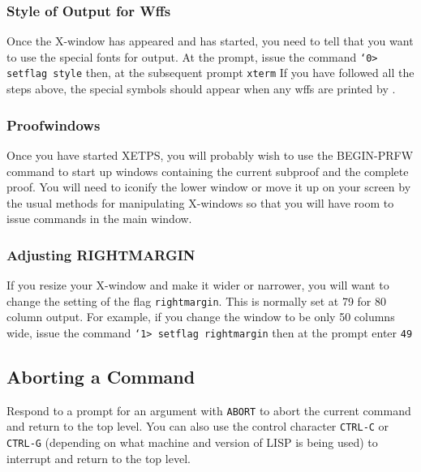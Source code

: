 \documentclass{article}
\begin{document}
\subsubsection{Style of Output for Wffs}

Once the X-window has appeared and {\ETPS} has started, you need to tell
{\ETPS} that you want to use the special fonts for output.  At the {\ETPS}
prompt, issue the command \newline{}
{\tt {\tt\char`\<}0> setflag style} \newline{}
then, at the subsequent prompt \newline{}
{\tt xterm}\newline{}
If you have followed all the steps
above, the special symbols should appear when any wffs are printed by
{\ETPS}.

\subsubsection{Proofwindows}

Once you have started XETPS, you will probably wish to use the
BEGIN-PRFW command to start up windows containing the current subproof
and the complete proof.  You will need to iconify the lower window or
move it up on your screen by the usual methods for manipulating
X-windows so that you will have room to issue commands in the main
{\ETPS} window.

\subsubsection{Adjusting RIGHTMARGIN}

If you resize your {\ETPS} X-window and make it wider or narrower, you will
want to change the setting of the flag {\tt rightmargin}.  This is normally
set at 79 for 80 column output.  For example, if you change the window to be
only 50 columns wide, issue the command \newline{}
{\tt {\tt\char`\<}1> setflag rightmargin}\newline{}
then at the prompt enter\newline{}
 {\tt 49}

\subsection{Aborting a Command}

Respond to a prompt for an argument with {\tt ABORT} to abort the current
command and return to the top level.  You can also use the control character
{\tt CTRL-C} or {\tt CTRL-G} (depending on what machine and version of LISP is
being used) to interrupt {\ETPS} and return to the top level.
\end{document}
